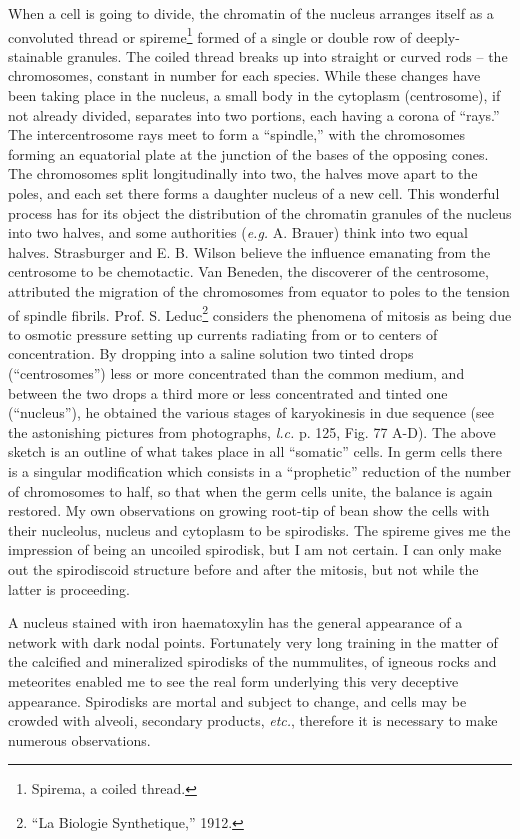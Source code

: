 \documentclass[a4paper, 12pt, oneside]{article}
\begin{document}
When a cell is going to divide, the chromatin of the nucleus arranges itself as a convoluted thread or spireme\footnote{Spirema, a coiled thread.} formed of a single or double row of deeply-stainable granules. The coiled thread breaks up into straight or curved rods -- the chromosomes, constant in number for each species. While these changes have been taking place in the nucleus, a small body in the cytoplasm (centrosome), if not already divided, separates into two portions, each having a corona of ``rays.'' The intercentrosome rays meet to form a ``spindle,'' with the chromosomes forming an equatorial plate at the junction of the bases of the opposing cones. The chromosomes split longitudinally into two, the halves move apart to the poles, and each set there forms a daughter nucleus of a new cell. This wonderful process has for its object the distribution of the chromatin granules of the nucleus into two halves, and some authorities (\emph{e.g.} A. Brauer) think into two equal halves. Strasburger and E. B. Wilson believe the influence emanating from the centrosome to be chemotactic. Van Beneden, the discoverer of the centrosome, attributed the migration of the chromosomes from equator to poles to the tension of spindle fibrils. Prof. S. Leduc\footnote{``La Biologie Synthetique,'' 1912.} considers the phenomena of mitosis as being due to osmotic pressure setting up currents radiating from or to centers of concentration. By dropping into a saline solution two tinted drops (``centrosomes'') less or more concentrated than the common medium, and between the two drops a third more or less concentrated and tinted one (``nucleus''), he obtained the various stages of karyokinesis in due sequence (see the astonishing pictures from photographs, \emph{l.c.} p. 125, Fig. 77 A-D). The above sketch is an outline of what takes place in all ``somatic'' cells. In germ cells there is a singular modification which consists in a ``prophetic'' reduction of the number of chromosomes to half, so that when the germ cells unite, the balance is again restored. My own observations on growing root-tip of bean show the cells with their nucleolus, nucleus and cytoplasm to be spirodisks. The spireme gives me the impression of being an uncoiled spirodisk, but I am not certain. I can only make out the spirodiscoid structure before and after the mitosis, but not while the latter is proceeding.

A nucleus stained with iron haematoxylin has the general appearance of a network with dark nodal points. Fortunately very long training in the matter of the calcified and mineralized spirodisks of the nummulites, of igneous rocks and meteorites enabled me to see the real form underlying this very deceptive appearance. Spirodisks are mortal and subject to change, and cells may be crowded with alveoli, secondary products, \emph{etc.}, therefore it is necessary to make numerous observations.
\end{document}
